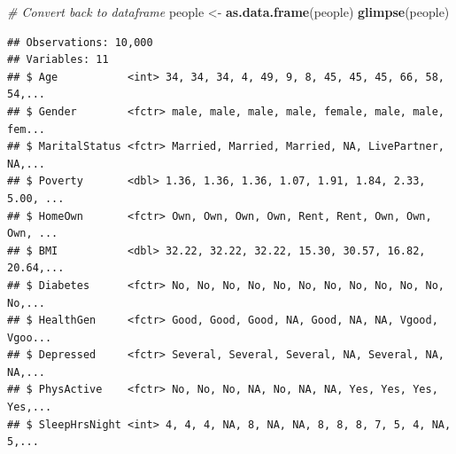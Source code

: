\documentclass[]{article}
\newenvironment{Shaded}{\begin{snugshade}}{\end{snugshade}}
\newcommand{\KeywordTok}[1]{\textcolor[rgb]{0.13,0.29,0.53}{\textbf{{#1}}}}
\newcommand{\StringTok}[1]{\textcolor[rgb]{0.31,0.60,0.02}{{#1}}}
\newcommand{\CommentTok}[1]{\textcolor[rgb]{0.56,0.35,0.01}{\textit{{#1}}}}
\newcommand{\NormalTok}[1]{{#1}}
\begin{document}
\begin{Shaded}
\begin{Highlighting}[]
\CommentTok{# Convert back to dataframe}
\NormalTok{people <-}\StringTok{ }\KeywordTok{as.data.frame}\NormalTok{(people)}
\KeywordTok{glimpse}\NormalTok{(people)}
\end{Highlighting}
\end{Shaded}

\begin{verbatim}
## Observations: 10,000
## Variables: 11
## $ Age           <int> 34, 34, 34, 4, 49, 9, 8, 45, 45, 45, 66, 58, 54,...
## $ Gender        <fctr> male, male, male, male, female, male, male, fem...
## $ MaritalStatus <fctr> Married, Married, Married, NA, LivePartner, NA,...
## $ Poverty       <dbl> 1.36, 1.36, 1.36, 1.07, 1.91, 1.84, 2.33, 5.00, ...
## $ HomeOwn       <fctr> Own, Own, Own, Own, Rent, Rent, Own, Own, Own, ...
## $ BMI           <dbl> 32.22, 32.22, 32.22, 15.30, 30.57, 16.82, 20.64,...
## $ Diabetes      <fctr> No, No, No, No, No, No, No, No, No, No, No, No,...
## $ HealthGen     <fctr> Good, Good, Good, NA, Good, NA, NA, Vgood, Vgoo...
## $ Depressed     <fctr> Several, Several, Several, NA, Several, NA, NA,...
## $ PhysActive    <fctr> No, No, No, NA, No, NA, NA, Yes, Yes, Yes, Yes,...
## $ SleepHrsNight <int> 4, 4, 4, NA, 8, NA, NA, 8, 8, 8, 7, 5, 4, NA, 5,...
\end{verbatim}

\begin{Shaded}
\end{Shaded}
\end{document}
